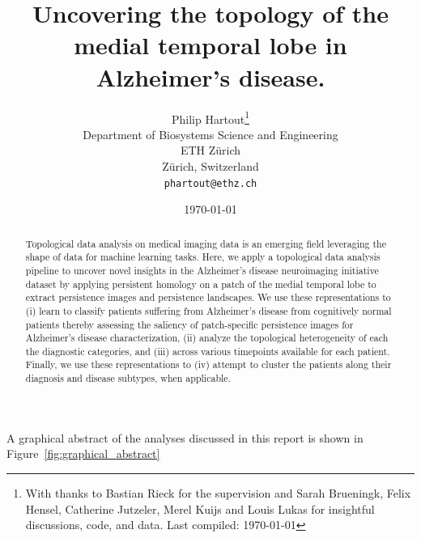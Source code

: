 \documentclass{article}
\title{Uncovering the topology of the medial temporal lobe in Alzheimer's disease.}
\author{Philip Hartout\thanks{With thanks to Bastian Rieck for the supervision and Sarah
  Brueningk, Felix Hensel, Catherine Jutzeler, Merel Kuijs and Louis Lukas for insightful discussions, code, and data. Last compiled: \today}\\ Department of Biosystems Science and Engineering\\ ETH Zürich\\ Zürich, Switzerland \\ \texttt{phartout@ethz.ch} \\ } \date{\today}
\begin{document}
\maketitle

\begin{abstract}
Topological data analysis on medical imaging data is an emerging field
leveraging the shape of data for machine learning tasks. Here, we apply a
topological data analysis pipeline to uncover novel insights in the Alzheimer's
disease neuroimaging initiative dataset by applying persistent homology on a
patch of the medial temporal lobe to extract persistence images and persistence
landscapes. We use these representations to (i) learn to classify patients
suffering from Alzheimer's disease from cognitively normal patients thereby
assessing the saliency of patch-specific persistence images for Alzheimer's
disease characterization, (ii) analyze the topological heterogeneity of each the
diagnostic categories, and (iii) across various timepoints available for each
patient. Finally, we use these representations to (iv) attempt to cluster the
patients along their diagnosis and disease subtypes, when applicable.
\end{abstract}

A graphical abstract of the analyses discussed in this report is shown in
Figure~\ref{fig:graphical_abstract}
\end{document}
